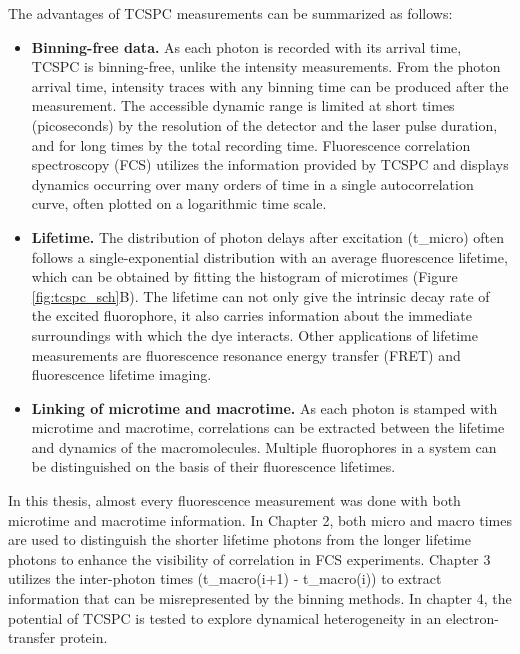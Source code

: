 The advantages of TCSPC measurements can be summarized as follows:
\begin{itemize}
	\item \textbf{Binning-free data.} As each photon is recorded with its arrival time, TCSPC is binning-free, unlike the intensity measurements.
	From the photon arrival time, intensity traces with any binning time can be produced after the measurement.
	The accessible dynamic range is limited at short times (picoseconds) by the resolution of the detector and the laser pulse duration, and for long times by the total recording time.
	Fluorescence correlation spectroscopy (FCS) utilizes the information provided by TCSPC and displays dynamics occurring over many orders of time in a single autocorrelation curve, often plotted on a logarithmic time scale.
	\item \textbf{Lifetime.} The distribution of photon delays after excitation (t\_micro) often follows a single-exponential distribution with an average fluorescence lifetime, which can be obtained by fitting the histogram of microtimes (Figure \ref{fig:tcspc_sch}B).
	The lifetime can not only give the intrinsic decay rate of the excited fluorophore, it also carries information about the immediate surroundings with which the dye interacts.
	Other applications of lifetime measurements are fluorescence resonance energy transfer (FRET) and fluorescence lifetime imaging.\cite{selvin2000the,lakowicz1992fluorescence} 
	\item \textbf{Linking of microtime and macrotime.} As each photon is stamped with microtime and macrotime, correlations can be extracted between the lifetime and dynamics of the macromolecules.
	Multiple fluorophores in a system can be distinguished on the basis of their fluorescence lifetimes.
\end{itemize}
In this thesis, almost every fluorescence measurement was done with both microtime and macrotime information.
In Chapter 2, both micro and macro times are used to distinguish the shorter lifetime photons from the longer lifetime photons to enhance the visibility of correlation in FCS experiments.
Chapter 3 utilizes the inter-photon times (t\_macro(i+1) - t\_macro(i)) to extract information that can be misrepresented by the binning methods.
In chapter 4, the potential of TCSPC is tested to explore dynamical heterogeneity in an electron-transfer protein. 
%
